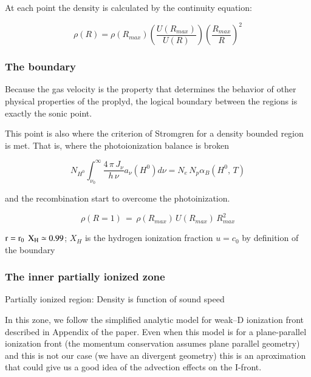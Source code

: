\documentclass[aaspp]{article}
\begin{document}
At each point the density is calculated by the continuity equation:

\begin{equation}
  \rho (R) = \rho (R_{max}) \left ( \frac{U(R_{max})}{U (R)} \right )
    \left ( \frac{R_{max}}{R} \right ) ^2
\end{equation}

\subsubsection{The boundary}
\label{sec:boundary}

Because the gas velocity is the property that determines the behavior of other physical properties of the proplyd, the logical boundary between the regions is exactly the sonic point.

This point is also where the criterion of Stromgren for a density bounded region is met. That is, where the photoionization balance is broken 

\begin{equation}
  N_{H^0} \displaystyle\int_{\nu_0}^{\infty} \frac{4 \, \pi \, J_\nu}{h \, \nu} a_\nu(H^0) d\nu = N_e \, N_p \alpha_B(H^0, \, T)
\end{equation}

and the recombination start to overcome the photoinization.

\begin{equation}
  \rho(R=1) \, = \, \rho(R_{max}) \, U(R_{max}) \, R^2_{max}
\end{equation}

$\rm r = r_0$
$\rm X_H \simeq 0.99$; $X_H$ is the hydrogen ionization fraction
$u = c_0$ by definition of the boundary

\subsubsection{The inner partially ionized zone}
\label{sec:inner}

Partially ionized region: Density is function of sound speed

In this zone, we follow the simplified analytic model for weak--D ionization front described in Appendix of the \citet{2005ApJ...621..328H} paper. Even when this model is for a plane-parallel ionization front (the momentum conservation assumes plane parallel geometry) and this is not our case (we have an divergent geometry) this is an aproximation that could give us a good idea of the advection effects on the I-front.
\end{document}
